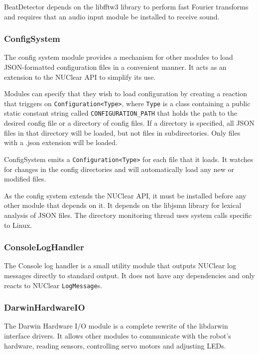 \documentclass[english,12pt]{scrartcl}
\begin{document}
				BeatDetector depends on the libfftw3 library to perform fast Fourier transforms
				and requires that an audio input module be installed to receive sound.
				
				
			\subsubsection{ConfigSystem}
				The config system module provides a mechanism for other modules to load
				JSON-formatted configuration files in a convenient manner. It acts as an
				extension to the NUClear API to simplify its use.
				
				Modules can specify that they wish to load configuration by creating a reaction
				that triggers on \texttt{Configuration<Type>}, where \texttt{Type} is a class
				containing a public static constant string called \texttt{CONFIGURATION\_PATH}
				that holds the path	to the desired config file or a directory of config files. If
				a directory is specified, all JSON files in that directory will be loaded, but
				not files in subdirectories. Only files with a .json extension will be loaded.
				
				ConfigSystem emits a \texttt{Configuration<Type>} for each file that it loads. It
				watches for changes in the config directories and will automatically load any new
				or modified files.
				
				As the config system extends the NUClear API, it must be installed before any
				other module that depends on it. It depends on the libjsmn library for lexical
				analysis of JSON files. The directory monitoring thread uses system calls
				specific to Linux.
				
			
			\subsubsection{ConsoleLogHandler}
				The Console log handler is a small utility module that outputs NUClear log
				messages directly to standard output. It does not have any dependencies and
				only reacts to NUClear \texttt{LogMessage}s.
				
				
			\subsubsection{DarwinHardwareIO}
				The Darwin Hardware I/O module is a complete rewrite of the libdarwin interface
				drivers. It allows other modules to communicate with the robot's hardware, reading
				sensors, controlling servo motors and adjusting LEDs.
				
\end{document}
